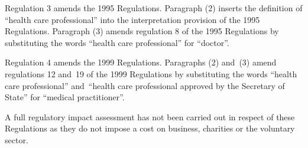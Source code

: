 \documentclass[12pt,a4paper]{article}
\begin{document}
Regulation 3 amends the 1995 Regulations. Paragraph (2) inserts the definition of “health care professional” into the interpretation provision of the 1995 Regulations. Paragraph (3) amends regulation 8 of the 1995 Regulations by substituting the words “health care professional” for “doctor”.

Regulation 4 amends the 1999 Regulations. Paragraphs (2) and~(3) amend regulations 12 and~19 of the 1999 Regulations by substituting the words “health care professional” and~“health care professional approved by the Secretary of State” for “medical practitioner”.

A full regulatory impact assessment has not been carried out in respect of these Regulations as they do not impose a cost on business, charities or the voluntary sector. 
\end{document}
